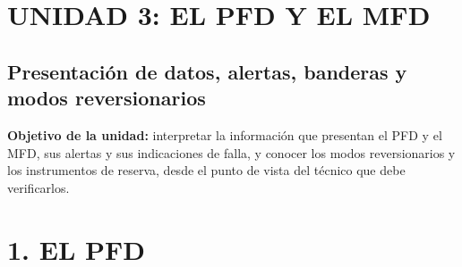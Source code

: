 \clearpage
\section*{UNIDAD 3: EL PFD Y EL MFD}
\subsection*{Presentación de datos, alertas, banderas y modos reversionarios}

\begin{recuadro}
\textbf{Objetivo de la unidad:} interpretar la información que presentan el PFD y el MFD, sus
alertas y sus indicaciones de falla, y conocer los modos reversionarios y los instrumentos de
reserva, desde el punto de vista del técnico que debe verificarlos.
\end{recuadro}

\section*{1. EL PFD}

